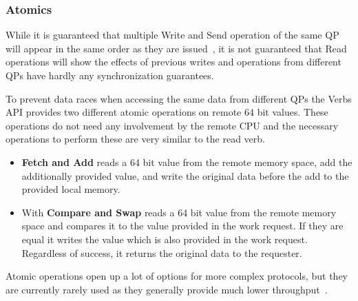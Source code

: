 \subsubsection{Atomics}

While it is guaranteed that multiple Write and Send operation of the same QP will appear in the same order as they are 
issued~\cite{}, it is not guaranteed that Read operations will show the effects of previous writes and operations from
different QPs have hardly any synchronization guarantees.

To prevent data races when accessing the same data from different QPs the Verbs API provides two different atomic operations 
on remote 64 bit values. These operations do not need any involvement by the remote CPU and the necessary operations 
to perform these are very similar to the read verb.


\begin{itemize}
  \item \textbf{Fetch and Add} reads a 64 bit value from the remote memory space, add the additionally provided 
     value, and write the original data before the add to the provided local memory.
  \item With \textbf{Compare and Swap} reads a 64 bit value from the remote memory space and compares it to 
    the  value provided in the work request. If they are equal it writes the value 
    which is also provided in the work request. Regardless of success, it returns the original data to the requester.
\end{itemize}

Atomic operations open up a lot of options for more complex protocols, but they are currently rarely used as they generally
provide much lower throughput~\cite{anuj-guide}.


